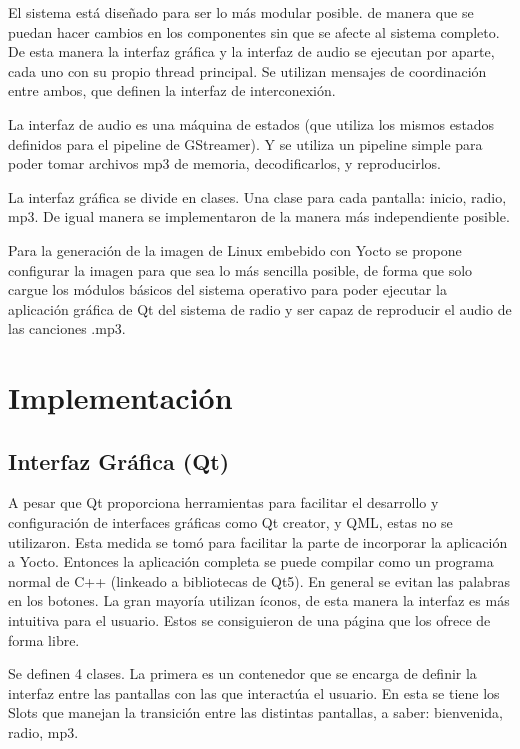 El sistema está diseñado para ser lo más modular posible. de manera que se puedan hacer cambios en
los componentes sin que se afecte al sistema completo. De esta manera la interfaz gráfica y la
interfaz de audio se ejecutan por aparte, cada uno con su propio thread principal. Se utilizan
mensajes de coordinación entre ambos, que definen la interfaz de interconexión.

La interfaz de audio es una máquina de estados (que utiliza los mismos estados definidos para el
pipeline de GStreamer). Y se utiliza un pipeline simple para poder tomar archivos mp3 de memoria,
decodificarlos, y reproducirlos.

La interfaz gráfica se divide en clases. Una clase para cada pantalla: inicio, radio, mp3. De igual
manera se implementaron de la manera más independiente posible. 

Para la generación de la imagen de Linux embebido con Yocto se propone
configurar la imagen para que sea lo más sencilla posible, de forma que solo
cargue los módulos básicos del sistema operativo para poder ejecutar la
aplicación gráfica de Qt del sistema de radio y ser capaz de reproducir el audio
de las canciones .mp3.  


\section{Implementación}
\label{sec:implementation}
\subsection{Interfaz Gráfica (Qt)}
\label{sec:qt}

A pesar que Qt proporciona herramientas para facilitar el desarrollo y configuración de interfaces
gráficas como Qt creator, y QML, estas no se utilizaron. Esta medida se tomó para facilitar la parte
de incorporar la aplicación a Yocto. Entonces la aplicación completa se puede compilar como un
programa normal de C++ (linkeado a bibliotecas de Qt5). En general se evitan las palabras en los
botones. La gran mayoría utilizan íconos, de esta manera la interfaz es más intuitiva para el
usuario. Estos se consiguieron de una página que los ofrece de forma libre.

Se definen 4 clases. La primera es un contenedor que se encarga de definir la interfaz entre las
pantallas con las que interactúa el usuario. En esta se tiene los Slots que manejan la transición
entre las distintas pantallas, a saber: bienvenida, radio, mp3.

